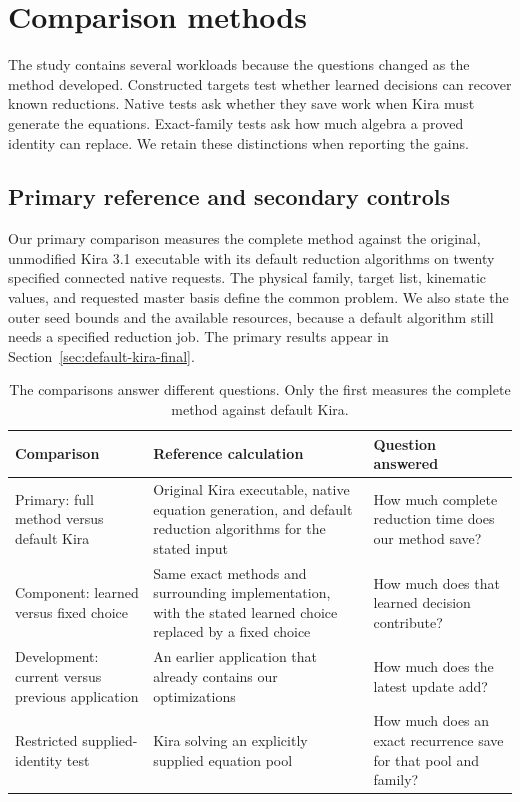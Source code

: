 \section{Comparison methods}
\label{sec:design}
The study contains several workloads because the questions changed as the method developed. Constructed targets test whether learned decisions can recover known reductions. Native tests ask whether they save work when Kira must generate the equations. Exact-family tests ask how much algebra a proved identity can replace. We retain these distinctions when reporting the gains.

\subsection{Primary reference and secondary controls}
Our primary comparison measures the complete method against the original, unmodified Kira 3.1 executable with its default reduction algorithms on twenty specified connected native requests. The physical family, target list, kinematic values, and requested master basis define the common problem. We also state the outer seed bounds and the available resources, because a default algorithm still needs a specified reduction job. The primary results appear in Section~\ref{sec:default-kira-final}.

\begin{table}[!htbp]\centering\small
\caption{The comparisons answer different questions. Only the first measures the complete method against default Kira.}
\label{tab:comparison-questions}
\begin{tabularx}{\linewidth}{@{}>{\raggedright\arraybackslash}p{3.1cm}YY@{}}\toprule
Comparison & Reference calculation & Question answered\\\midrule
Primary: full method versus default Kira & Original Kira executable, native equation generation, and default reduction algorithms for the stated input & How much complete reduction time does our method save?\\
Component: learned versus fixed choice & Same exact methods and surrounding implementation, with the stated learned choice replaced by a fixed choice & How much does that learned decision contribute?\\
Development: current versus previous application & An earlier application that already contains our optimizations & How much does the latest update add?\\
Restricted supplied-identity test & Kira solving an explicitly supplied equation pool & How much does an exact recurrence save for that pool and family?\\\bottomrule
\end{tabularx}
\end{table}

